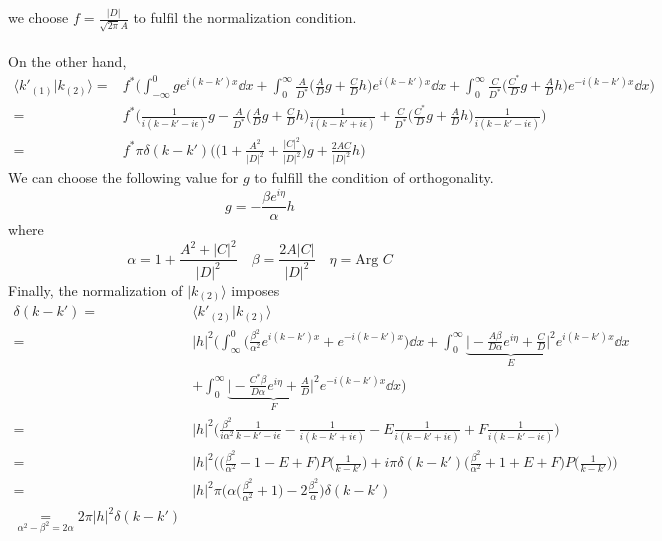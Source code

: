 we choose $f = \frac{|D|}{\sqrt{2\pi} A}$ to fulfil the normalization condition. \\\\
On the other hand, 
\begin{equation}
\begin{split}
\langle k'_{(1)} | k_{(2)} \rangle = &
f^*\bigg( \int_{-\infty}^0 g e^{i(k-k')x} \dd x + \int_0^{\infty} \frac{A}{D^*}\big(\frac{A}{D}g + \frac{C}{D}h \big) e^{i(k-k')x} \dd x + \int^{\infty}_0 \frac{C}{D^*} \big( \frac{C^*}{D}g + \frac{A}{D}h \big) e^{-i(k - k')x} \dd x \bigg)   \\
= & f^*\Big( \frac{1}{i(k-k' - i\epsilon)} g - \frac{A}{D^*}\big(\frac{A}{D} g + \frac{C}{D} h \big) \frac{1}{i(k-k' + i\epsilon)} + \frac{C}{D^*}\big( \frac{C^*}{D}g + \frac{A}{D}h \big) \frac{1}{i(k-k' -i\epsilon)} \Big)    \\
= & f^* \pi \delta(k-k') \Big(  \big(1+ \frac{A^2}{|D|^2} + \frac{|C|^2}{|D|^2} \big) g + \frac{2AC}{|D|^2}h  \Big)
\end{split}
\end{equation}
We can choose the following value for $g$ to fulfill the condition of orthogonality.
\begin{equation*}
g = - \frac{\beta e^{i\eta}}{\alpha} h
\end{equation*}
where 
\begin{equation*}
\alpha = 1 + \frac{A^2 + |C|^2}{|D|^2}  \quad
 \beta = \frac{2A|C|}{|D|^2}  \quad
\eta = \textrm{Arg } C
\end{equation*}
Finally, the normalization of $| k_{(2)} \rangle$ imposes 
\begin{equation}
\begin{split}
\delta(k - k') = & \langle k'_{(2)} | k_{(2)} \rangle \\
= & |h|^2 \bigg( \int_{\infty}^0 \Big( \frac{\beta^2}{\alpha^2} e^{i(k-k')x} + e^{-i(k-k')x} \Big) \dd x 
+ \int_0^{\infty} \underbrace{\Big|-\frac{A\beta}{D\alpha} e^{i\eta} + \frac{C}{D}\Big|^2}_{\text{$E$}} e^{i(k-k')x} \dd x \\
& + \int_0^{\infty}\underbrace{\Big|-\frac{C^*\beta}{D\alpha} e^{i\eta} + \frac{A}{D}\Big|^2}_{\text{$F$}} e^{-i(k-k')x}\dd x \bigg) \\
= & |h|^2 \bigg(\frac{\beta^2}{i \alpha^2}\frac{1}{k-k'-i\epsilon} - \frac{1}{i(k-k'+i\epsilon)} - E\frac{1}{i(k-k'+i\epsilon)} + F \frac{1}{i(k-k'-i\epsilon)} \bigg)   \\
= & |h|^2 \bigg( \Big(\frac{\beta^2}{\alpha^2} - 1 - E + F \Big) P\big(\frac{1}{k-k'}\big) + i\pi \delta(k-k')\Big(\frac{\beta^2}{\alpha^2} + 1 + E + F \Big) P\big(\frac{1}{k-k'}\big) \bigg)  \\
= & |h|^2\pi \bigg( \alpha\Big(\frac{\beta^2}{\alpha^2} + 1 \Big) - 2\frac{\beta^2}{\alpha}  \bigg) \delta (k-k')\\
\underset{\alpha^2 - \beta^2 = 2\alpha}{=}  2\pi|h|^2 \delta(k-k')
\end{split}
\end{equation}
